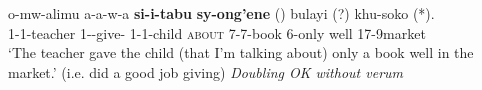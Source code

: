 \documentclass[output=paper]{langscibook}
\begin{document}
\ea \label{ChanaWordOrderAtvP}

\gll o-mw-alimu a-a-w-a  \textbf{si-i-tabu} \textbf{sy-ong’ene} (\Checkmark) bulayi (?) khu-soko (*). \\
1-1-teacher 1\Sm-\Om-give-\Fv{} {1-1-child \hspace{3.7mm} \textsc{about}} 7-7-book 6-only {} well {} 17-9market \\
\glt `The teacher gave the child (that I'm talking about) only a book well in the market.' (i.e. did a good job giving) \textit{Doubling OK without verum}





\z 
\end{document}
